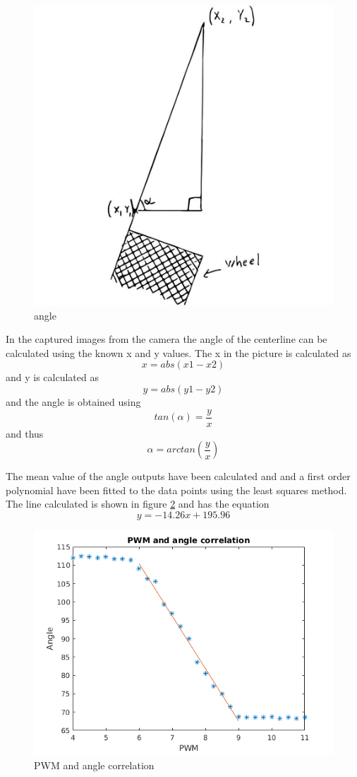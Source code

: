 \begin{figure}[H]
  \includegraphics[scale=0.25]{./img/angle.JPG}
  \centering
  \caption{angle}
  \label{fig:angle}
\end{figure}


In the captured images from the camera the angle of the centerline can be calculated using the known x and y values. The x in the picture is calculated as $$x = abs(x1-x2)$$ and y is calculated as $$y=abs(y1-y2)$$ and the angle is obtained using $$tan(\alpha)=\frac{y}{x}$$ and thus $$\alpha = arctan(\frac{y}{x})$$


The mean value of the angle outputs have been calculated and and a first order polynomial have been fitted to the data points using the least squares method. The line calculated is shown in figure  \ref{fig:PWM and angle correlation} and has the equation $$ y=-14.26x + 195.96$$

\begin{figure}[H]
  \includegraphics[width=\textwidth]{./img/PWMPLOT_2.png}
  \centering
  \caption{PWM and angle correlation}
  \label{fig:PWM and angle correlation}
\end{figure}

